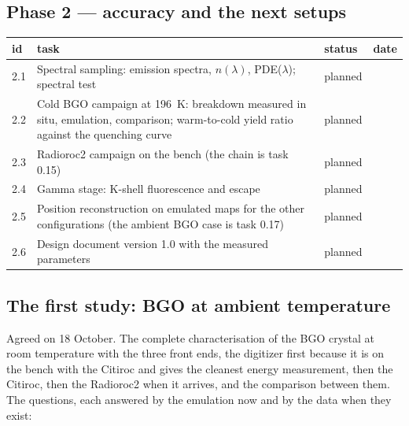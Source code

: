 \documentclass[11pt]{article}
\newcommand{\planned}{planned}
\begin{document}
\subsection*{Phase 2 --- accuracy and the next setups}

\begin{longtable}{p{} p{} p{} p{}}
\toprule
id & task & status & date \\
\midrule
\endhead
2.1 & Spectral sampling: emission spectra, $n(\lambda)$, PDE($\lambda$); spectral test & \planned & \\
2.2 & Cold BGO campaign at 196~K: breakdown measured in situ, emulation, comparison; warm-to-cold yield ratio against the quenching curve & \planned & \\
2.3 & Radioroc2 campaign on the bench (the chain is task 0.15) & \planned & \\
2.4 & Gamma stage: K-shell fluorescence and escape & \planned & \\
2.5 & Position reconstruction on emulated maps for the other configurations (the ambient BGO case is task 0.17) & \planned & \\
2.6 & Design document version 1.0 with the measured parameters & \planned & \\
\bottomrule
\end{longtable}

\subsection*{The first study: BGO at ambient temperature}
\label{sec:firststudy}

Agreed on 18 October. The complete characterisation of the BGO crystal at
room temperature with the three front ends, the digitizer first because it
is on the bench with the Citiroc and gives the cleanest energy measurement,
then the Citiroc, then the Radioroc2 when it arrives, and the comparison
between them. The questions, each answered by the emulation now and by the
data when they exist:
\end{document}
